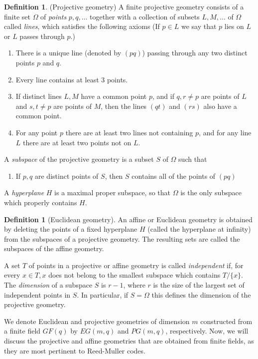\documentclass[12pt,twoside]{reedthesis}
\theoremstyle{definition}
\newtheorem{definition}[theorem]{Definition}
\begin{document}
\begin{definition}(Projective geometry) A finite projective geometry consists of a finite set $\Omega$ of \textit{points} $p, q, \ldots$ together with a collection of subsets $L, M, \ldots$ of $\Omega$ called \textit{lines}, which satisfies the following axioms (If $p \in L$ we say that $p$ lies on $L$ or $L$ passes through $p$.)
\begin{enumerate}
\item There is a unique line (denoted by $(pq)$) passing through any two distinct points $p$ and $q$.
\item Every line contains at least 3 points.
\item If distinct lines $L, M$ have a common point $p$, and if $q,  r\neq p$ are points of $L$ and $s, t\neq p$ are points of $M$, then the lines $(qt)$ and $(rs)$ also have a common point.
\item For any point $p$ there are at least two lines not containing $p$, and for any line $L$ there are at least two points not on $L$.
\end{enumerate}
A \textit{subspace} of the projective geometry is a subset $S$ of $\Omega$ such that
\begin{enumerate}[resume]
\item If $p,q$ are distinct points of $S$, then $S$ contains all of the points of $(pq)$
\end{enumerate}
A \textit{hyperplane} $H$ is a maximal proper subspace, so that $\Omega$ is the only subspace which properly contains $H$.
\end{definition}

\begin{definition}[Euclidean geometry] An affine or Euclidean geometry is obtained by deleting the points of a fixed hyperplane $H$ (called the hyperplane at infinity) from the subspaces of a projective geometry. The resulting sets are called the subspaces of the affine geometry.

A set $T$ of points in a projective or affine geometry is called \textit{independent} if, for every $x \in T, x$ does not belong to the smallest subspace which contains $T/\{x\}$. The \textit{dimension} of a subspace $S$ is $r-1$, where $r$ is the size of the largest set of independent points in $S$. In particular, if $S = \Omega$ this defines the dimension of the projective geometry.
\end{definition}

We denote Euclidean and projective geometries of dimension $m$ constructed from a finite field $GF(q)$ by $EG(m,q)$ and $PG(m,q)$, respectively. Now, we will discuss the projective and affine geometries that are obtained from finite fields, as they are most pertinent to Reed-Muller codes.
\end{document}
